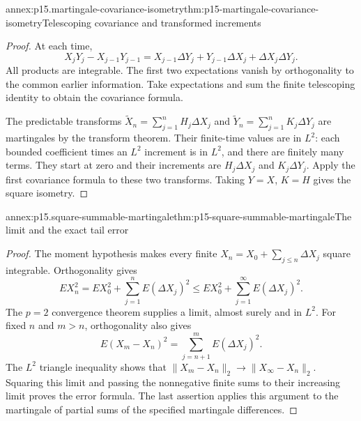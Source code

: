 \begin{annexitem}{annex:p15.martingale-covariance-isometry}{thm:p15-martingale-covariance-isometry}{Telescoping covariance and transformed increments}
\begin{proof}
At each time,
\[
 X_jY_j-X_{j-1}Y_{j-1}
      =X_{j-1}\Delta Y_j+Y_{j-1}\Delta X_j+\Delta X_j\Delta Y_j.
\]
All products are integrable. The first two expectations vanish
by orthogonality to the common earlier information.
Take expectations and sum the finite telescoping identity to
obtain the covariance formula.

The predictable transforms
\(\widetilde X_n=\sum_{j=1}^nH_j\Delta X_j\) and
\(\widetilde Y_n=\sum_{j=1}^nK_j\Delta Y_j\)
are martingales by the transform theorem.
Their finite-time values are in \(L^2\): each bounded coefficient
times an \(L^2\) increment is in \(L^2\), and there are finitely
many terms. They start at zero and their increments are
\(H_j\Delta X_j\) and \(K_j\Delta Y_j\).
Apply the first covariance formula to these two transforms.
Taking \(Y=X\), \(K=H\) gives the square isometry.
\end{proof}
\end{annexitem}

\begin{annexitem}{annex:p15.square-summable-martingale}{thm:p15-square-summable-martingale}{The limit and the exact tail error}
\begin{proof}
The moment hypothesis makes every finite
\(X_n=X_0+\sum_{j\leq n}\Delta X_j\) square integrable.
Orthogonality gives
\[
              EX_n^2=EX_0^2+\sum_{j=1}^nE(\Delta X_j)^2
                       \leq EX_0^2+\sum_{j=1}^\infty E(\Delta X_j)^2.
\]
The \(p=2\) convergence theorem supplies a limit, almost surely
and in \(L^2\).
For fixed \(n\) and \(m>n\), orthogonality also gives
\[
                         E(X_m-X_n)^2
                                   =\sum_{j=n+1}^mE(\Delta X_j)^2.
\]
The \(L^2\) triangle inequality shows that
\(\|X_m-X_n\|_2\to\|X_\infty-X_n\|_2\).
Squaring this limit and passing the nonnegative finite sums
to their increasing limit proves the error formula.
The last assertion applies this argument to the martingale
of partial sums of the specified martingale differences.
\end{proof}
\end{annexitem}

